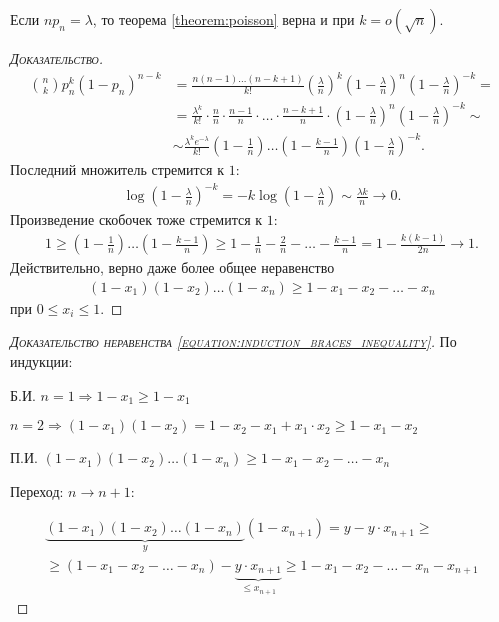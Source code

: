\documentclass[../main.tex]{subfiles}
\begin{document}
\begin{remrk*}
 Если $np_n = \lambda$, то теорема \ref{theorem:poisson} верна и при $k = o(\sqrt{n})$.
\end{remrk*}
\begin{proof}[\normalfont\textsc{Доказательство}]
 \begin{align*}
  \binom n k p_n^{k} (1-p_n)^{n-k} &= \frac{n(n-1)\ldots(n-k+1)}{k!} \left( \frac{\lambda}{n} \right)^{k}\left(1 - \frac{\lambda}{n}\right)^{n} \left( 1 - \frac{\lambda}{n} \right)^{-k} = \\
  &=  \frac{\lambda^{k}}{k!} \cdot \frac{n}{n} \cdot \frac{n-1}{n} \cdot \ldots \cdot \frac{n-k+1}{n} \cdot \left( 1 - \frac{\lambda}{n} \right)^{n} \left( 1 - \frac{\lambda}{n} \right)^{-k} \sim \\
  &\sim \frac{\lambda^{k}e^{-\lambda}}{k!} \left( 1 - \frac{1}{n} \right) \ldots \left(1 - \frac{k - 1}{n}\right) \left( 1 - \frac{\lambda}{n} \right)^{-k}
 .\end{align*} Последний множитель стремится к $1$:
 \begin{align*}
  \log \left( 1 - \frac{\lambda}{n} \right)^{-k} = -k \log \left( 1 - \frac{\lambda}{n} \right) \sim \frac{\lambda k}{n} \to 0
 .\end{align*} Произведение скобочек тоже стремится к $1$:
 \begin{align*}
  1 \geqslant \left( 1 - \frac{1}{n} \right) \ldots \left( 1 - \frac{k-1}{n} \right) \geqslant 1 - \frac{1}{n} - \frac{2}{n} - \ldots - \frac{k - 1}{n} = 1- \frac{k(k-1)}{2n} \to 1
  .\end{align*} Действительно, верно даже более общее неравенство
  \begin{align}
   \label{equation:induction_braces_inequality}
  (1-x_1)(1-x_2)\ldots(1-x_n) \geqslant 1 - x_1 - x_2 - \ldots - x_n
 \end{align}  при $0 \leqslant x_i \leqslant 1$.
\end{proof}

\begin{proof}[\normalfont\textsc{Доказательство неравенства \eqref{equation:induction_braces_inequality}}]
 По индукции:

 Б.И. $n = 1 \Rightarrow 1 - x_1 \geq 1 - x_1$ 

 $n = 2 \Rightarrow (1 - x_1)(1 - x_2) = 1 - x_2 - x_1 + x_1 \cdot x_2 \geq 1 - x_1 - x_2$

 П.И. $(1 - x_1)(1 - x_2) \dots (1 - x_n) \geq 1 - x_1 - x_2 - \dots - x_n$

 Переход: $n \to n + 1$:

 \begin{align*}
  \underbrace{(1 - x_1)(1 - x_2) \dots (1 - x_n)}_{y}(1-x_{n + 1}) = y - y \cdot x_{n+1} \geq \\ \geq(1 - x_1 - x_2 - \dots - x_n) - \underbrace{y \cdot x_{n + 1}}_{\leq x_{n + 1}} \geq 1 - x_1 - x_2 - \dots - x_n - x_{n + 1}
 \end{align*}
\end{proof}
\end{document}
